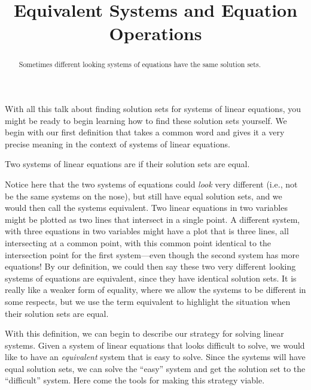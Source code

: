 \documentclass{ximera}
\title{Equivalent Systems and Equation Operations}
\begin{document}
\begin{abstract}
  Sometimes different looking systems of equations have the same solution sets.
\end{abstract}
\maketitle

With all this talk about finding solution sets for systems of linear
equations, you might be ready to begin learning how to find these
solution sets yourself.  We begin with our first definition that takes
a common word and gives it a very precise meaning in the context of
systems of linear equations.

\begin{definition}
  Two systems of linear equations are  if
  their solution sets are equal.
\end{definition}

Notice here that the two systems of equations could \textit{look} very
different (i.e., not be the same systems on the nose), but still have
equal solution sets, and we would then call the systems equivalent.
Two linear equations in two variables might be plotted as two lines
that intersect in a single point.  A different system, with three
equations in two variables might have a plot that is three lines, all
intersecting at a common point, with this common point identical to
the intersection point for the first system---even though the second
system has more equations!  By our definition, we could then say these
two very different looking systems of equations are equivalent, since
they have identical solution sets.  It is really like a weaker form of
equality, where we allow the systems to be different in some respects,
but we use the term equivalent to highlight the situation when their
solution sets are equal.

With this definition, we can begin to describe our strategy for
solving linear systems.  Given a system of linear equations that looks
difficult to solve, we would like to have an \textit{equivalent}
system that is easy to solve.  Since the systems will have equal
solution sets, we can solve the ``easy'' system and get the solution
set to the ``difficult'' system.  Here come the tools for making this
strategy viable.
\end{document}

